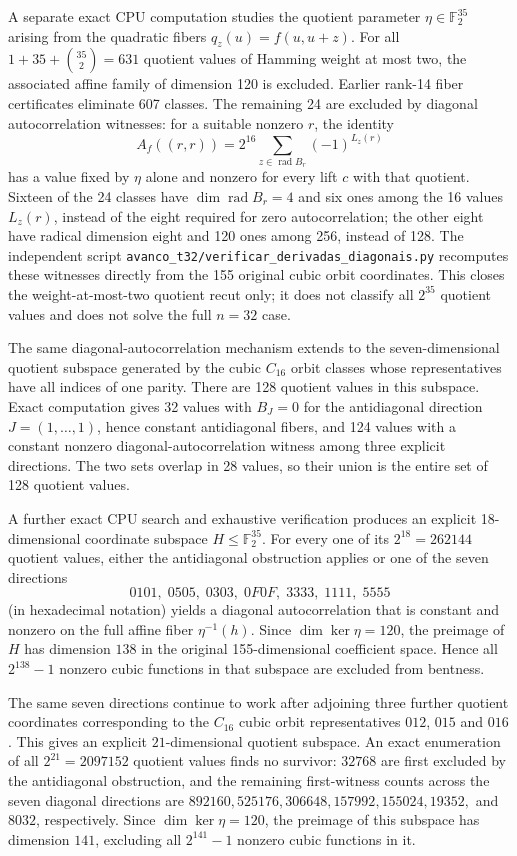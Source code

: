 \documentclass[11pt,a4paper]{article}
\newcommand{\F}{\mathbb F_2}
\begin{document}
A separate exact CPU computation studies the quotient parameter $\eta\in\F^{35}$ arising from the quadratic fibers $q_z(u)=f(u,u+z)$. For all $1+35+\binom{35}{2}=631$ quotient values of Hamming weight at most two, the associated affine family of dimension 120 is excluded. Earlier rank-14 fiber certificates eliminate 607 classes. The remaining 24 are excluded by diagonal autocorrelation witnesses: for a suitable nonzero $r$, the identity
\[
 A_f((r,r))=2^{16}\sum_{z\in\operatorname{rad} B_r}(-1)^{L_z(r)}
\]
has a value fixed by $\eta$ alone and nonzero for every lift $c$ with that quotient. Sixteen of the 24 classes have $\dim\operatorname{rad} B_r=4$ and six ones among the 16 values $L_z(r)$, instead of the eight required for zero autocorrelation; the other eight have radical dimension eight and 120 ones among 256, instead of 128. The independent script \texttt{avanco\_t32/verificar\_derivadas\_diagonais.py} recomputes these witnesses directly from the 155 original cubic orbit coordinates. This closes the weight-at-most-two quotient recut only; it does not classify all $2^{35}$ quotient values and does not solve the full $n=32$ case.

The same diagonal-autocorrelation mechanism extends to the seven-dimensional quotient subspace generated by the cubic $C_{16}$ orbit classes whose representatives have all indices of one parity. There are 128 quotient values in this subspace. Exact computation gives 32 values with $B_J=0$ for the antidiagonal direction $J=(1,\ldots,1)$, hence constant antidiagonal fibers, and 124 values with a constant nonzero diagonal-autocorrelation witness among three explicit directions. The two sets overlap in 28 values, so their union is the entire set of 128 quotient values.

A further exact CPU search and exhaustive verification produces an explicit 18-dimensional coordinate subspace $H\le\F^{35}$. For every one of its $2^{18}=262144$ quotient values, either the antidiagonal obstruction applies or one of the seven directions
\[
0101,\;0505,\;0303,\;0F0F,\;3333,\;1111,\;5555
\]
(in hexadecimal notation) yields a diagonal autocorrelation that is constant and nonzero on the full affine fiber $\eta^{-1}(h)$. Since $\dim\ker\eta=120$, the preimage of $H$ has dimension $138$ in the original 155-dimensional coefficient space. Hence all $2^{138}-1$ nonzero cubic functions in that subspace are excluded from bentness.

The same seven directions continue to work after adjoining three further quotient coordinates corresponding to the $C_{16}$ cubic orbit representatives $012$, $015$ and $016$. This gives an explicit $21$-dimensional quotient subspace. An exact enumeration of all $2^{21}=2097152$ quotient values finds no survivor: $32768$ are first excluded by the antidiagonal obstruction, and the remaining first-witness counts across the seven diagonal directions are $892160, 525176, 306648, 157992, 155024, 19352,$ and $8032$, respectively. Since $\dim\ker\eta=120$, the preimage of this subspace has dimension $141$, excluding all $2^{141}-1$ nonzero cubic functions in it.
\end{document}
